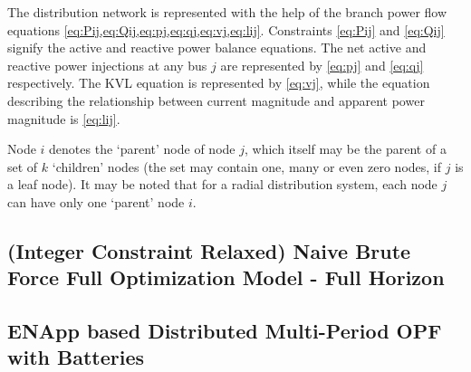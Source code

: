 \documentclass{article}
\begin{document}
The distribution network is represented with the help of the branch power flow equations \cref{eq:Pij,eq:Qij,eq:pj,eq:qj,eq:vj,eq:lij}. Constraints \cref{eq:Pij} and \cref{eq:Qij} signify the active and reactive power balance equations. The net active and reactive power injections at any bus \(j\) are represented by \cref{eq:pj} and \cref{eq:qj} respectively. The KVL equation is represented by \cref{eq:vj}, while the equation describing the relationship between current magnitude and apparent power magnitude is \cref{eq:lij}.  

Node $i$ denotes the `parent' node of node $j$, which itself may be the parent of a set of $k$ `children' nodes (the set may contain one, many or even zero nodes, if $j$ is a leaf node). It may be noted that for a radial distribution system, each node $j$ can have only one `parent' node $i$.

\subsection*{(Integer Constraint Relaxed) Naive Brute Force Full Optimization Model - Full Horizon}



\subsection{ENApp based Distributed Multi-Period OPF with Batteries}
\end{document}
